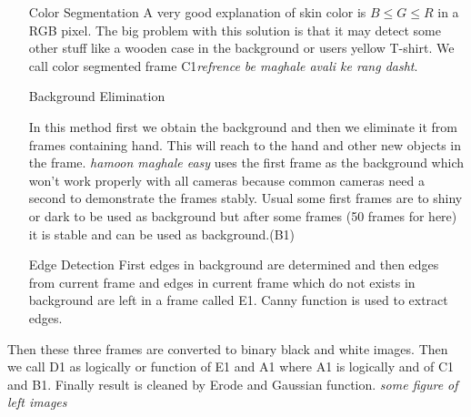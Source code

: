 \documentclass{report}
\begin{document}
\begin{enumerate}
	\item[Color Segmentation]{A very good explanation of skin color is $B \le G \le R$ in a RGB pixel. The big problem with this solution is that it may detect some other stuff like a wooden case in the background or users yellow T-shirt. We call color segmented frame C1\textit{refrence be maghale avali ke rang dasht}.}
	\item[Background Elimination]{In this method first we obtain the background and then we eliminate it from frames containing hand. This will reach to the hand and other new objects in the frame. \textit{hamoon maghale easy} uses the first frame as the background which won't work properly with all cameras because common cameras need a second to demonstrate the frames stably. Usual some first frames are to shiny or dark to be used as background but after some frames (50 frames for here) it is stable and can be used as background.(B1)  
	\begin{figure}
	\end{figure}
	} %
	\item[Edge Detection] {First edges in background are determined and then edges from current frame and edges in current frame which do not exists in background are left in a frame called E1. Canny function is used to extract edges.}
\end{enumerate}
Then these three frames are converted to binary black and white images. Then we call D1 as logically or function of E1 and A1 where A1 is logically and of C1 and B1. Finally result is cleaned by Erode and Gaussian function. 
\textit{some figure of left images}
\end{document}
